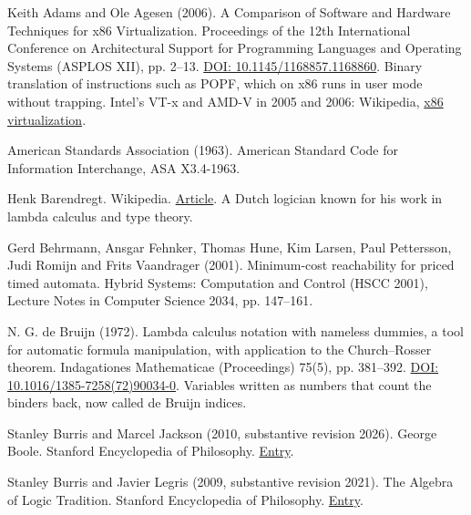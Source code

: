 \documentclass[11pt,twoside]{article}
\theoremstyle{thielethm}
\theoremstyle{thieledef}
\theoremstyle{thieledef}
\theoremstyle{thieledef}
\theoremstyle{thielethm}
\theoremstyle{thieleobs}
\theoremstyle{thielethm}
\begin{document}
\noindent Keith Adams and Ole Agesen (2006). A Comparison of Software and Hardware Techniques for x86 Virtualization. Proceedings of the 12th International Conference on Architectural Support for Programming Languages and Operating Systems (ASPLOS XII), pp. 2--13. \href{https://doi.org/10.1145/1168857.1168860}{DOI: 10.1145/1168857.1168860}. Binary translation of instructions such as POPF, which on x86 runs in user mode without trapping. Intel's VT-x and AMD-V in 2005 and 2006: Wikipedia, \href{https://en.wikipedia.org/wiki/X86_virtualization}{x86 virtualization}.
\par\medskip

\noindent American Standards Association (1963). American Standard Code for Information Interchange, ASA X3.4-1963.
\par\medskip

\noindent Henk Barendregt. Wikipedia. \href{https://en.wikipedia.org/wiki/Henk_Barendregt}{Article}. A Dutch logician known for his work in lambda calculus and type theory.
\par\medskip

\noindent Gerd Behrmann, Ansgar Fehnker, Thomas Hune, Kim Larsen, Paul Pettersson, Judi Romijn and Frits Vaandrager (2001). Minimum-cost reachability for priced timed automata. Hybrid Systems: Computation and Control (HSCC 2001), Lecture Notes in Computer Science 2034, pp. 147--161.
\par\medskip

\noindent N. G. de Bruijn (1972). Lambda calculus notation with nameless dummies, a tool for automatic formula manipulation, with application to the Church--Rosser theorem. Indagationes Mathematicae (Proceedings) 75(5), pp. 381--392. \href{https://doi.org/10.1016/1385-7258(72)90034-0}{DOI: 10.1016/1385-7258(72)90034-0}. Variables written as numbers that count the binders back, now called de Bruijn indices.
\par\medskip

\noindent Stanley Burris and Marcel Jackson (2010, substantive revision 2026). George Boole. Stanford Encyclopedia of Philosophy. \href{https://plato.stanford.edu/entries/boole/}{Entry}.
\par\medskip

\noindent Stanley Burris and Javier Legris (2009, substantive revision 2021). The Algebra of Logic Tradition. Stanford Encyclopedia of Philosophy. \href{https://plato.stanford.edu/entries/algebra-logic-tradition/}{Entry}.
\par\medskip
\end{document}

